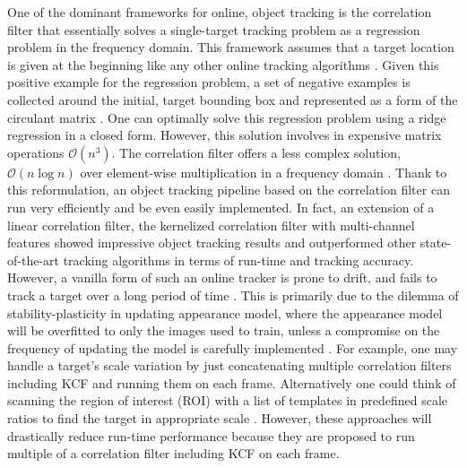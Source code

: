 \documentclass[10pt,twocolumn,letterpaper]{article}
\begin{document}
One of the dominant frameworks for online, object tracking is the
correlation filter that essentially solves a single-target tracking
problem as a regression problem in the frequency domain. This
framework assumes that a target location is given at the beginning
like any other online tracking algorithms
\cite{smeulders2014survey}. Given this positive example for the
regression problem, a set of negative examples is collected around the
initial, target bounding box and represented as a form of the
circulant matrix \cite{henriques2015high}. One can optimally solve
this regression problem using a ridge regression in a closed
form. However, this solution involves in expensive matrix operations
$\mathcal{O}(n^{3})$. The correlation filter offers a less complex
solution, $\mathcal{O}(n\log n)$ over element-wise multiplication in a
frequency domain \cite{bolme2010visual,henriques2015high}. Thank to
this reformulation, an object tracking pipeline based on the
correlation filter can run very efficiently and be even easily
implemented. In fact, an extension of a linear correlation filter, the
kernelized correlation filter with multi-channel features
\cite{henriques2015high} showed impressive object tracking results and
outperformed other state-of-the-art tracking algorithms in terms of
run-time and tracking accuracy. However, a vanilla form of such an
online tracker is prone to drift, and fails to track a target over a
long period of time \cite{henriques2015high}. This is primarily due to
the dilemma of stability-plasticity in updating appearance model,
where the appearance model will be overfitted to only the images used
to train, unless a compromise on the frequency of updating the model
is carefully implemented \cite{santner2010prost}. For example, one may
handle a target's scale variation by just concatenating multiple
correlation filters including KCF and running them on each
frame. Alternatively one could think of scanning the region of
interest (ROI) with a list of templates in predefined scale ratios to
find the target in appropriate scale
\cite{henriques2015high,tang2015multi,ma2015long,bibi2015multi,li2014scale}. However,
these approaches will drastically reduce run-time performance because
they are proposed to run multiple of a correlation filter including
KCF on each frame.
\end{document}
